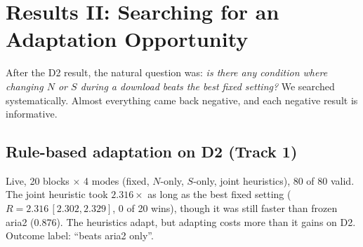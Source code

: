 \chapter{Results II: Searching for an Adaptation Opportunity}\label{ch:opportunity}
After the D2 result, the natural question was: \emph{is there any condition where changing $N$ or $S$ during a download beats the best fixed setting?} We searched systematically. Almost everything came back negative, and each negative result is informative.

\section{Rule-based adaptation on D2 (Track 1)}
Live, 20 blocks $\times$ 4 modes (fixed, $N$-only, $S$-only, joint heuristics), 80 of 80 valid. The joint heuristic took $\mathbf{2.316}\times$ as long as the best fixed setting ($R=2.316\,[2.302, 2.329]$, 0 of 20 wins), though it was still faster than frozen aria2 (0.876). The heuristics adapt, but adapting costs more than it gains on D2. Outcome label: ``beats aria2 only''.

